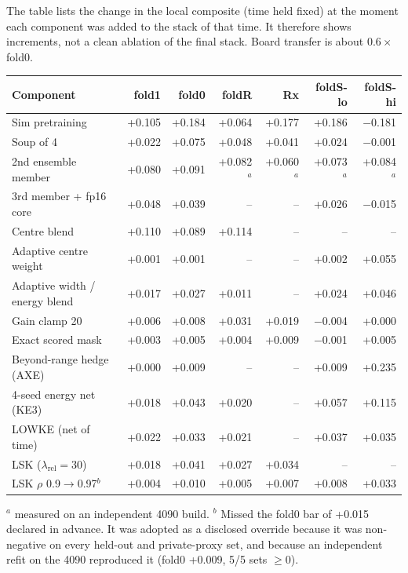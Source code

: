 \documentclass[10pt]{article}
\begin{document}
The table lists the change in the local composite (time held fixed) at the moment each component was added to
the stack of that time. It therefore shows increments, not a clean ablation of the final stack. Board transfer
is about $0.6\times$ fold0.

\begin{center}\small
\begin{tabular}{@{}lrrrrrr@{}}\toprule
Component & fold1 & fold0 & foldR & Rx & foldS-lo & foldS-hi\\\midrule
Sim pretraining            & +0.105 & +0.184 & +0.064 & +0.177 & +0.186 & $-$0.181\\
Soup of 4                  & +0.022 & +0.075 & +0.048 & +0.041 & +0.024 & $-$0.001\\
2nd ensemble member        & +0.080 & +0.091 & +0.082$^a$ & +0.060$^a$ & +0.073$^a$ & +0.084$^a$\\
3rd member + fp16 core     & +0.048 & +0.039 & -- & -- & +0.026 & $-$0.015\\
Centre blend               & +0.110 & +0.089 & +0.114 & -- & -- & --\\
Adaptive centre weight     & +0.001 & +0.001 & -- & -- & +0.002 & +0.055\\
Adaptive width / energy blend & +0.017 & +0.027 & +0.011 & -- & +0.024 & +0.046\\
Gain clamp 20              & +0.006 & +0.008 & +0.031 & +0.019 & $-$0.004 & +0.000\\
Exact scored mask          & +0.003 & +0.005 & +0.004 & +0.009 & $-$0.001 & +0.005\\
Beyond-range hedge (AXE)   & +0.000 & +0.009 & -- & -- & +0.009 & +0.235\\
4-seed energy net (KE3)    & +0.018 & +0.043 & +0.020 & -- & +0.057 & +0.115\\
LOWKE (net of time)        & +0.022 & +0.033 & +0.021 & -- & +0.037 & +0.035\\
LSK ($\lambda_{\text{rel}}=30$)& +0.018 & +0.041 & +0.027 & +0.034 & -- & --\\
LSK $\rho$ 0.9$\to$0.97$^b$ & +0.004 & +0.010 & +0.005 & +0.007 & +0.008 & +0.033\\\bottomrule
\end{tabular}
\end{center}
{\footnotesize $^a$ measured on an independent 4090 build.
$^b$ Missed the fold0 bar of +0.015 declared in advance. It was adopted as a disclosed override because it was
non-negative on every held-out and private-proxy set, and because an independent refit on the 4090 reproduced
it (fold0 +0.009, 5/5 sets $\ge0$).}
\end{document}
